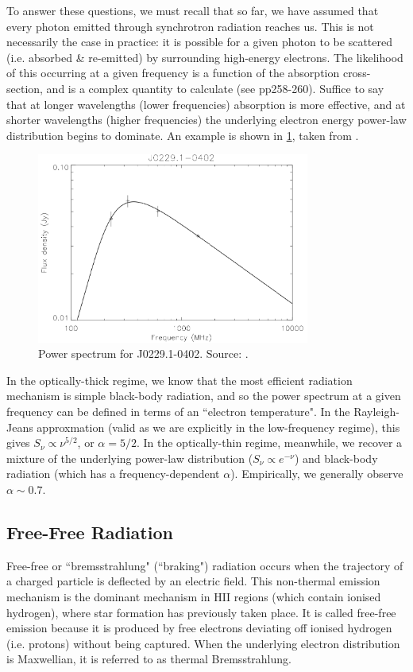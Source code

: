 \pg
To answer these questions, we must recall that so far, we have assumed that every photon emitted through synchrotron radiation reaches us. This is not necessarily the case in practice: it is possible for a given photon to be scattered (i.e. absorbed \& re-emitted) by surrounding high-energy electrons. The likelihood of this occurring at a given frequency is a function of the absorption cross-section, and is a complex quantity to calculate (see  pp258-260). Suffice to say that at longer wavelengths (lower frequencies) absorption is more effective, and at shorter wavelengths (higher frequencies) the underlying electron energy power-law  distribution begins to dominate. An example is shown in \cref{fig.synchrotron}, taken from .

\begin{figure}[!h]
\centering
\includegraphics[width=0.8\textwidth]{images/synchrotron-spectrum.png}
\caption{\label{fig.synchrotron} Power spectrum for J0229.1-0402. Source: .}
\end{figure}

\pg
In the optically-thick regime, we know that the most efficient radiation mechanism is simple black-body radiation, and so the power spectrum at a given frequency can be defined in terms of an ``electron temperature". In the Rayleigh-Jeans approxmation (valid as we are explicitly in the low-frequency regime), this gives $S_\nu \propto \nu^{5/2}$, or $\alpha=5/2$. 
In the optically-thin regime, meanwhile, we recover a mixture of the underlying power-law distribution ($S_\nu \propto e^{-\nu}$) and black-body radiation (which has a frequency-dependent $\alpha$). Empirically, we generally observe $\alpha \sim 0.7$.


\subsection{Free-Free Radiation}
\pg
Free-free or ``bremsstrahlung" (``braking") radiation occurs when the trajectory of a charged particle is deflected by an electric field. This non-thermal emission mechanism is the dominant mechanism in HII regions (which contain ionised hydrogen), where star formation has previously taken place. It is called free-free emission because it is produced by free electrons deviating off ionised hydrogen (i.e. protons) without being captured. When the underlying electron distribution is Maxwellian, it is referred to as thermal Bremsstrahlung.

